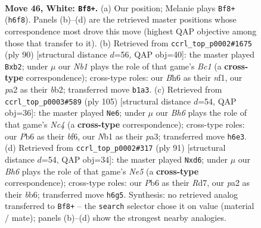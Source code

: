 \documentclass[11pt]{article}
\begin{document}
\clearpage

\begin{figure}[p]\centering
\begin{subfigure}{0.46\textwidth}\centering
\resizebox{\linewidth}{!}{%
\newchessgame
\chessboard[
  setfen={2b3R1/p3k2p/1P3r1B/4nP2/1p1p4/8/p3P3/1N1K4 w - - 0 46},
  showmover=false,
  pgfstyle=straightmove, color=movearrow, markmove={h6-f8}
]}
\caption{}
\end{subfigure}\hfill
\begin{subfigure}{0.46\textwidth}\centering
\resizebox{\linewidth}{!}{%
\newchessgame
\chessboard[
  setfen={8/2R4p/3pk3/1r6/pP3P2/5P2/Pb1p1N1P/2B2n1K w - - 2 46},
  showmover=false,
  pgfstyle=straightmove, color=movearrow, markmove={c1-b2}
]}
\caption{}
\end{subfigure}
\\[4pt]
\begin{subfigure}{0.46\textwidth}\centering
\resizebox{\linewidth}{!}{%
\newchessgame
\chessboard[
  setfen={8/8/p1k2B1p/2n2Rp1/5p1P/Pr3P2/4K1P1/8 b - - 6 53},
  showmover=false,
  pgfstyle=straightmove, color=movearrow, markmove={c5-e6}
]}
\caption{}
\end{subfigure}\hfill
\begin{subfigure}{0.46\textwidth}\centering
\resizebox{\linewidth}{!}{%
\newchessgame
\chessboard[
  setfen={8/3r1k2/1BpP3p/p2pR3/P3n1P1/2P5/1P4K1/8 b - - 0 46},
  showmover=false,
  pgfstyle=straightmove, color=movearrow, markmove={e4-d6}
]}
\caption{}
\end{subfigure}
\caption{\textbf{Move 46, White: \texttt{Bf8+}.} (a) Our position; Melanie plays \texttt{Bf8+} (\texttt{h6f8}). Panels (b)--(d) are the retrieved master positions whose correspondence most drove this move (highest QAP objective among those that transfer to it). (b) Retrieved from \texttt{ccrl\_top\_p0002\#1675} (ply 90) [structural distance $d$=56, QAP obj=40]: the master played \texttt{Bxb2}; under $\mu$ our \emph{Nb1} plays the role of that game's \emph{Bc1} (a \textbf{cross-type} correspondence); cross-type roles: our \emph{B}h6 as their \emph{n}f1, our \emph{p}a2 as their \emph{b}b2; transferred move \texttt{b1a3}. (c) Retrieved from \texttt{ccrl\_top\_p0003\#589} (ply 105) [structural distance $d$=54, QAP obj=36]: the master played \texttt{Ne6}; under $\mu$ our \emph{Bh6} plays the role of that game's \emph{Nc4} (a \textbf{cross-type} correspondence); cross-type roles: our \emph{P}b6 as their \emph{b}f6, our \emph{N}b1 as their \emph{p}a3; transferred move \texttt{h6e3}. (d) Retrieved from \texttt{ccrl\_top\_p0002\#317} (ply 91) [structural distance $d$=54, QAP obj=34]: the master played \texttt{Nxd6}; under $\mu$ our \emph{Bh6} plays the role of that game's \emph{Ne5} (a \textbf{cross-type} correspondence); cross-type roles: our \emph{P}b6 as their \emph{R}d7, our \emph{p}a2 as their \emph{b}b6; transferred move \texttt{h6g5}. Synthesis: no retrieved analog transferred to \texttt{Bf8+} -- the \texttt{search} selector chose it on value (material / mate); panels (b)--(d) show the strongest nearby analogies.}
\label{fig:thought-m90}
\end{figure}
\end{document}
